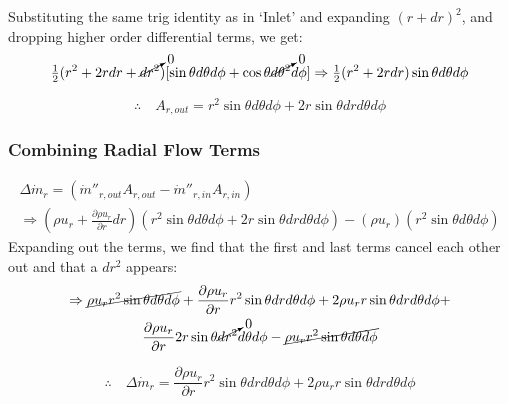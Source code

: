 \documentclass[12pt, letterpaper, twoside]{article}
\begin{document}
            Substituting the same trig identity as in `Inlet' and expanding \((r + dr)^2\), and dropping higher order differential terms, we get:
            \begin{equation*}
                \tfrac{1}{2} (r^2 + 2rdr + \cancelto{0}{dr^2}) [\sin\theta d\theta d\phi + \cos\theta \cancelto{0}{d\theta^2} d\phi]
                \Rightarrow \tfrac{1}{2} (r^2 + 2rdr) \sin\theta d\theta d\phi
            \end{equation*}

            \begin{equation}
                \therefore\quad A_{r,out} = r^2 \sin\theta d\theta d\phi + 
                2r\sin\theta drd\theta d\phi
                \label{eq:Arout_final}
            \end{equation}

        \subsubsection{Combining Radial Flow Terms}
            \begin{multline*}
                \Delta\dot{m}_r = (\dot{m}''_{r,out} A_{r,out} - \dot{m}''_{r,in} A_{r,in}) 
                \\\Rightarrow
                \left(\rho u_r  + \frac{\partial \rho u_r}{\partial r} dr\right)\left(r^2 \sin\theta d\theta d\phi + 2r\sin\theta dr d\theta d\phi\right) -
                \left(\rho u_r\right)\left(r^2 \sin\theta d\theta d\phi\right)
            \end{multline*}
            Expanding out the terms, we find that the first and last terms cancel each other out and that a \(dr^2\) appears:
            \begin{multline*}
                \Rightarrow
                \cancel{\rho u_r r^2 \sin\theta d\theta d\phi} +
                \frac{\partial \rho u_r}{\partial r} r^2 \sin\theta dr d\theta d\phi +
                2\rho u_r r\sin\theta dr d\theta d\phi + \\
                \frac{\partial \rho u_r}{\partial r} 2r\sin\theta \cancelto{0}{dr^2} d\theta d\phi - 
                \cancel{\rho u_r r^2 \sin\theta d\theta d\phi}
            \end{multline*}

            \begin{equation}\label{eq:mdotr}
                \therefore\quad
                \boxed{\Delta\dot{m}_r = \frac{\partial \rho u_r}{\partial r} r^2 \sin\theta dr d\theta d\phi +
                2\rho u_r r\sin\theta dr d\theta d\phi}
            \end{equation}
\end{document}
